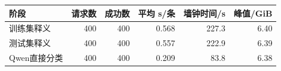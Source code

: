 \begin{tabular}{lrrrrr}
\toprule
阶段 & 请求数 & 成功数 & 平均 s/条 & 墙钟时间/s & 峰值/GiB \\
\midrule
训练集释义 & 400 & 400 & 0.568 & 227.3 & 6.40 \\ 
测试集释义 & 400 & 400 & 0.557 & 222.9 & 6.39 \\ 
Qwen直接分类 & 400 & 400 & 0.209 & 83.8 & 6.38 \\ 
\bottomrule
\end{tabular}
